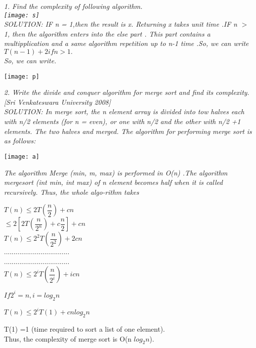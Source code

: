 \documentclass[a4paper,9pt]{beamer}
\begin{document}
\begin{frame}
\it
1. Find the complexity of following algorithm.\\
\texttt{[image: s]}\\
SOLUTION: IF n = 1,then the result is x. Returning x takes unit time .IF n $ >$ 1, then the algorithm enters into the else part . This part contains a multipplication and a same algorithm repetition up to n-1 time .So, we can write $ T(n-1) +2 if n> 1.$\\
So, we can write.
\end{frame}
\begin{frame}
\begin{center}
\texttt{[image: p]}\\
\end{center}
\end{frame}
\begin{frame}
\it
2. Write the divide and conquer algorithm for merge sort and find its complexity.[Sri Venkateswara University 2008]\\
SOLUTION: In merge sort, the n element array is divided into tow halves each with n/2 elements (for n = even), or one with n/2 and the other with n/2 +1 elements. The two halves and merged. The algorithm for performing merge sort is as follows:
\end{frame}
\begin{frame}
\texttt{[image: a]}
\end{frame}
\begin{frame}
\it
The algorithm{ \small Merge (min, m, max)} is performed in O(n) .The algorithm {\small mergesort (int min, int max)} of n element becomes half when it is called recursively. Thus, the whole algo-rithm takes\\
\begin{center}
$T(n) \leq 2T\left(\dfrac{n}{2}\right) +cn $\\

\vspace{3mm}
$ \leq 2\left[ 2T\left( \dfrac{n}{2^{n}}\right) +c\dfrac{n}{2}\right] +cn $\\


\vspace{3mm}
$ T(n)\leq 2^{2}T\left( \dfrac{n}{2^{2}}\right) +2cn $\\
..................................\\
..................................\\
$ T(n)\leq 2^{i} T\left( \dfrac{n}{2^{i}}\right) +icn $

\vspace{3mm}
$ If 2^{i} = n, i=log_{2} n $

\vspace{3mm}
$ T(n) \leq 2^{i}T(1) + cn log_{2} n $\\
\end{center}
T(1) =1 (time required to sort a list of one element).\\
Thus, the complexity of merge sort is O(n $log_{2} n$).


\end{frame}
\end{document}
